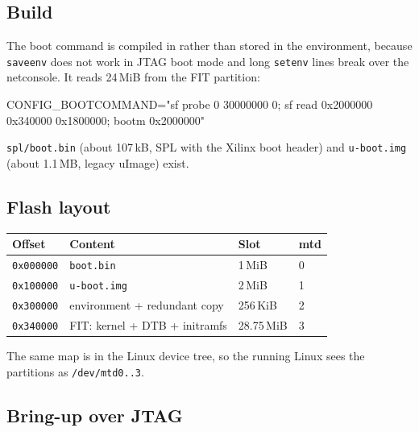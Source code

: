 \documentclass[11pt,a4paper,oneside]{article}
\newcommand{\file}[1]{{\color{bluemid}\nolinkurl{#1}}}
\newcommand{\cmd}[1]{\texttt{#1}}
\begin{document}
\subsection{Build}

The boot command is compiled in rather than stored in the environment,
because \cmd{saveenv} does not work in JTAG boot mode and long \cmd{setenv}
lines break over the netconsole. It reads 24\,MiB from the FIT partition:

\begin{code}
CONFIG_BOOTCOMMAND="sf probe 0 30000000 0; sf read 0x2000000 0x340000 0x1800000; bootm 0x2000000"
\end{code}


\begin{checkpoint}
\file{spl/boot.bin} (about 107\,kB, SPL with the Xilinx boot header) and
\file{u-boot.img} (about 1.1\,MB, legacy uImage) exist.
\end{checkpoint}

\subsection{Flash layout}

\begin{center}\small
\begin{tabular}{@{}llll@{}}
\toprule
Offset & Content & Slot & mtd \\
\midrule
\cmd{0x000000} & \file{boot.bin} & 1\,MiB & 0 \\
\cmd{0x100000} & \file{u-boot.img} & 2\,MiB & 1 \\
\cmd{0x300000} & environment + redundant copy & 256\,KiB & 2 \\
\cmd{0x340000} & FIT: kernel + DTB + initramfs & 28.75\,MiB & 3 \\
\bottomrule
\end{tabular}
\end{center}

The same map is in the Linux device tree, so the running Linux sees the
partitions as \file{/dev/mtd0..3}.

\subsection{Bring-up over JTAG}
\end{document}
